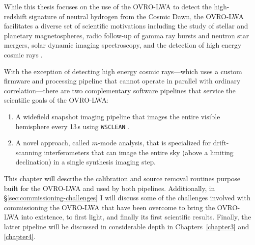 \begin{bibunit}
While this thesis focuses on the use of the OVRO-LWA to detect the high-redshift signature of
neutral hydrogen from the Cosmic Dawn, the OVRO-LWA facilitates a diverse set of scientific
motivations including the study of stellar and planetary magnetospheres, radio follow-up of gamma
ray bursts \citep{2017arXiv171106665A} and neutron star mergers, solar dynamic imaging spectroscopy,
and the detection of high energy cosmic rays \citep{caltechthesis11016}.

With the exception of detecting high energy cosmic rays---which uses a custom firmware and
processing pipeline that cannot operate in parallel with ordinary correlation---there are two
complementary software pipelines that service the scientific goals of the OVRO-LWA:
\begin{enumerate}
    \item A widefield snapshot imaging pipeline that images the entire visible hemisphere every
        13\,s using \texttt{WSCLEAN} \citep{2014MNRAS.444..606O}.
    \item A novel approach, called $m$-mode analysis, that is specialized for drift-scanning
        interferometers that can image the entire sky (above a limiting declination) in a single
        synthesis imaging step.
\end{enumerate}
This chapter will describe the calibration and source removal routines purpose built for the
OVRO-LWA and used by both pipelines. Additionally, in \S\ref{sec:commissioning-challenges} I will
discuss some of the challenges involved with commissioning the OVRO-LWA that have been overcome to
bring the OVRO-LWA into existence, to first light, and finally its first scientific results.
Finally, the latter pipeline will be discussed in considerable depth in Chapters~\ref{chapter3} and
\ref{chapter4}.


\end{bibunit}
